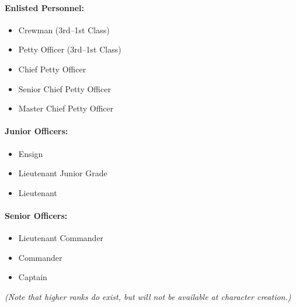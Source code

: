 \documentclass[12pt,titlepage,openany]{book}
\begin{document}
\begin{multicols}{2}
    \raggedcolumns
    \paragraph{Enlisted Personnel:}
    \begin{itemize}
        \item Crewman (3rd--1st Class)
        \item Petty Officer (3rd--1st Class)
        \item Chief Petty Officer
        \item Senior Chief Petty Officer
        \item Master Chief Petty Officer
    \end{itemize}

    \columnbreak
    \paragraph{Junior Officers:}
    \begin{itemize}
        \item Ensign
        \item Lieutenant Junior Grade
        \item Lieutenant
    \end{itemize}

    \paragraph{Senior Officers:}
    \begin{itemize}
        \item Lieutenant Commander
        \item Commander
        \item Captain
    \end{itemize}
\end{multicols}

\noindent \emph{(Note that higher ranks do exist, but will not be available at
character creation.)}

\vspace{1em}
\end{document}

